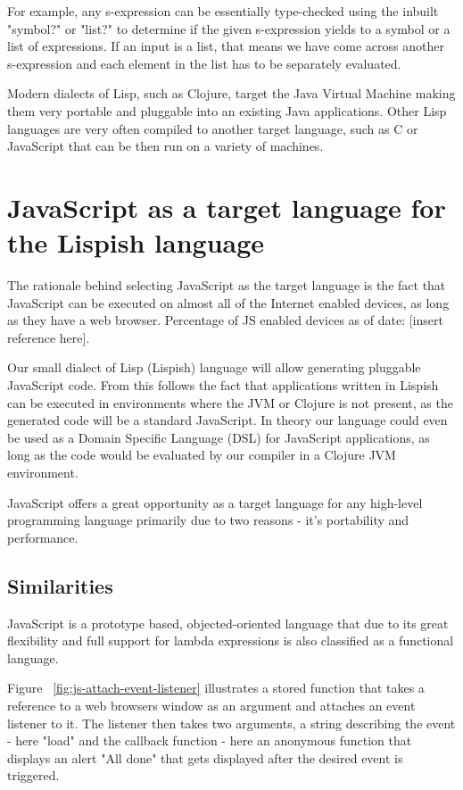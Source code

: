 For example, any s-expression can be essentially type-checked using the inbuilt "symbol?" or "list?" to determine if the given s-expression yields to a symbol or a list of expressions. If an input is a list, that means we have come across another s-expression and each element in the list has to be separately evaluated.

Modern dialects of Lisp, such as Clojure, target the Java Virtual Machine making them very portable and pluggable into an existing Java applications.
Other Lisp languages are very often compiled to another target language, such as C or JavaScript that can be then run on a variety of machines.

\section{JavaScript as a target language for the Lispish language}
The rationale behind selecting JavaScript as the target language is the fact that JavaScript can be executed on almost all of the Internet enabled devices, as long as they have a web browser. Percentage of JS enabled devices as of date: [insert reference here].

Our small dialect of Lisp (Lispish) language will allow generating pluggable JavaScript code.
From this follows the fact that applications written in Lispish can be executed in environments where the JVM or Clojure is not present, as the generated code will be a standard JavaScript.
In theory our language could even be used as a Domain Specific Language (DSL) for JavaScript applications, as long as the code would be evaluated by our compiler in a Clojure JVM environment.

JavaScript offers a great opportunity as a target language for any high-level programming language primarily due to two reasons - it's portability and performance.

\subsection{Similarities}
JavaScript is a prototype based, objected-oriented language that due to its great flexibility and full support for lambda expressions is also classified as a functional language.



Figure ~\ref{fig:js-attach-event-listener}  illustrates a stored function that takes a reference to a web browsers window as an argument and attaches an event listener to it. The listener then takes two arguments, a string describing the event - here "load" and the callback function - here an anonymous function that displays an alert "All done" that gets displayed after the desired event is triggered.

